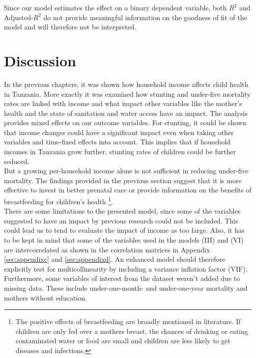 \documentclass[a4paper, 11pt]{article} %
\begin{document}
Since our model estimates the effect on a binary dependent variable, both $R^{2}$ and Adjusted-$R^{2}$ do not provide meaningful information on the goodness of fit of the model and will therefore not be interpreted.


\section{Discussion}
In the previous chapters, it was shown how household income affects child health in Tanzania. More exactly it was examined how stunting and under-five mortality rates are linked with income and what impact other variables like the mother's health and the state of sanitation and water access have an impact. The analysis provides mixed effects on our outcome variables. For stunting, it could be shown that income changes could have a significant impact even when taking other variables and time-fixed effects into account. This implies that if household incomes in Tanzania grow further, stunting rates of children could be further reduced. \\

But a growing per-household income alone is not sufficient in reducing under-five mortality. The findings provided in the previous section suggest that it is more effective to invest in better prenatal care or provide information on the benefits of breastfeeding for children's health \footnote{The positive effects of breastfeeding are broadly mentioned in literature. If children are only fed over a mothers breast, the chances of drinking or eating contaminated water or food are small and children are less likely to get diseases and infections.}. \\

There are some limitations to the presented model, since some of the variables suggested to have an impact by previous research could not be included. This could lead us to tend to evaluate the impact of income as too large. Also, it has to be kept in mind that some of the variables used in the models (III) and (VI) are intercorrelated as shown in the correlation matrices in Appendix \ref{sec:appendixc} and \ref{sec:appendixd}. An enhanced model should therefore explicitly test for multicollinearity by including a variance inflation factor (VIF). Furthermore, some variables of interest from the dataset weren't added due to missing data. These include under-one-month- and under-one-year mortality and mothers without education. \\
\end{document}
